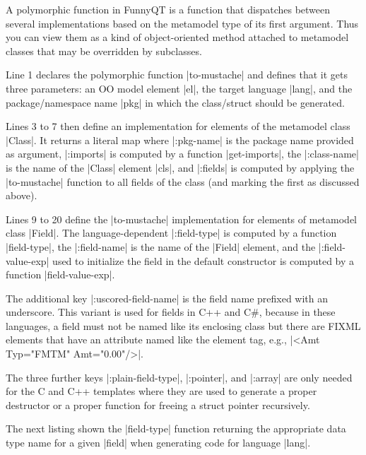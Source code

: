 \documentclass[a4paper]{article}
\newcommand{\code}{\clojureinline}
\begin{document}
A polymorphic function in FunnyQT is a function that dispatches between several
implementations based on the metamodel type of its first argument.  Thus you
can view them as a kind of object-oriented method attached to metamodel classes
that may be overridden by subclasses.

Line 1 declares the polymorphic function \code|to-mustache| and defines that it
gets three parameters: an OO model element \code|el|, the target language
\code|lang|, and the package/namespace name \code|pkg| in which the
class/struct should be generated.

Lines 3 to 7 then define an implementation for elements of the metamodel class
\code|Class|.  It returns a literal map where \code|:pkg-name| is the package
name provided as argument, \code|:imports| is computed by a function
\code|get-imports|, the \code|:class-name| is the name of the \code|Class|
element \code|cls|, and \code|:fields| is computed by applying the
\code|to-mustache| function to all fields of the class (and marking the first
as discussed above).

Lines 9 to 20 define the \code|to-mustache| implementation for elements of
metamodel class \code|Field|.  The language-dependent \code|:field-type| is
computed by a function \code|field-type|, the \code|:field-name| is the name of
the \code|Field| element, and the \code|:field-value-exp| used to initialize
the field in the default constructor is computed by a function
\code|field-value-exp|.

The additional key \code|:uscored-field-name| is the field name prefixed with
an underscore.  This variant is used for fields in C++ and C\#, because in
these languages, a field must not be named like its enclosing class but there
are FIXML elements that have an attribute named like the element tag, e.g.,
\xmlinline|<Amt Typ="FMTM" Amt="0.00"/>|.

The three further keys \code|:plain-field-type|, \code|:pointer|, and
\code|:array| are only needed for the C and C++ templates where they are used
to generate a proper destructor or a proper function for freeing a struct
pointer recursively.

The next listing shown the \code|field-type| function returning the appropriate
data type name for a given \code|field| when generating code for language
\code|lang|.
\end{document}
